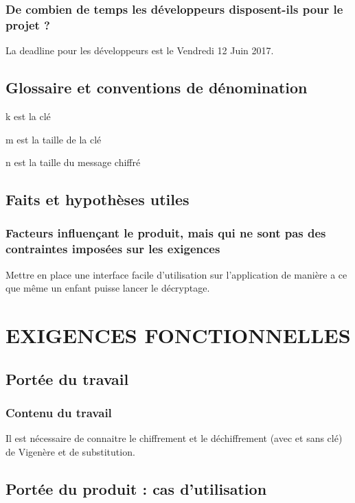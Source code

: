 \documentclass[a4]{article}
\begin{document}
			\subsubsection{ De combien de temps les développeurs disposent-ils pour le projet ?}
				La deadline pour les développeurs est le Vendredi 12 Juin 2017.
		\subsection{Glossaire et conventions de dénomination}
		
			k est la clé

			m est la taille de la clé

			n est la taille du message chiffré
			
		\subsection{Faits et hypothèses utiles}	
			\subsubsection{Facteurs influençant le produit, mais qui ne sont pas des contraintes imposées sur les exigences}
	
		Mettre en place une interface facile d'utilisation sur l'application de manière a ce que même un enfant puisse lancer le décryptage.
	\section{EXIGENCES FONCTIONNELLES}
		\subsection{Portée du travail}
			\subsubsection{Contenu du travail}
				Il est nécessaire de connaitre le chiffrement et le déchiffrement (avec et sans clé) de Vigenère et de substitution.
		\subsection{Portée du produit : cas d’utilisation}
\end{document}
